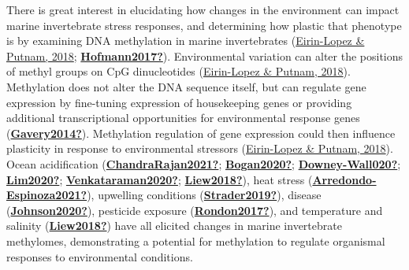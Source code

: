 \documentclass [11pt, proquest] {uwthesis}[2015/03/03]
\begin{document}
There is great interest in elucidating how changes in the environment can impact marine invertebrate stress responses, and determining how plastic that phenotype is by examining DNA methylation in marine invertebrates (\protect\hyperlink{ref-Eirin-Lopez2018}{Eirin-Lopez \& Putnam, 2018}; \protect\hyperlink{ref-Hofmann2017}{\textbf{Hofmann2017?}}). Environmental variation can alter the positions of methyl groups on CpG dinucleotides (\protect\hyperlink{ref-Eirin-Lopez2018}{Eirin-Lopez \& Putnam, 2018}). Methylation does not alter the DNA sequence itself, but can regulate gene expression by fine-tuning expression of housekeeping genes or providing additional transcriptional opportunities for environmental response genes (\protect\hyperlink{ref-Gavery2014}{\textbf{Gavery2014?}}). Methylation regulation of gene expression could then influence plasticity in response to environmental stressors (\protect\hyperlink{ref-Eirin-Lopez2018}{Eirin-Lopez \& Putnam, 2018}). Ocean acidification (\protect\hyperlink{ref-ChandraRajan2021}{\textbf{ChandraRajan2021?}}; \protect\hyperlink{ref-Bogan2020}{\textbf{Bogan2020?}}; \protect\hyperlink{ref-Downey-Wall020}{\textbf{Downey-Wall020?}}; \protect\hyperlink{ref-Lim2020}{\textbf{Lim2020?}}; \protect\hyperlink{ref-Venkataraman2020}{\textbf{Venkataraman2020?}}; \protect\hyperlink{ref-Liew2018}{\textbf{Liew2018?}}), heat stress (\protect\hyperlink{ref-Arredondo-Espinoza2021}{\textbf{Arredondo-Espinoza2021?}}), upwelling conditions (\protect\hyperlink{ref-Strader2019}{\textbf{Strader2019?}}), disease (\protect\hyperlink{ref-Johnson2020}{\textbf{Johnson2020?}}), pesticide exposure (\protect\hyperlink{ref-Rondon2017}{\textbf{Rondon2017?}}), and temperature and salinity (\protect\hyperlink{ref-Liew2018}{\textbf{Liew2018?}}) have all elicited changes in marine invertebrate methylomes, demonstrating a potential for methylation to regulate organismal responses to environmental conditions.
\end{document}
